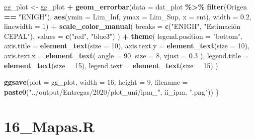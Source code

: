 \documentclass[
  12pt,
]{book}
\newenvironment{Shaded}{\begin{snugshade}}{\end{snugshade}}
\newcommand{\AttributeTok}[1]{\textcolor[rgb]{0.13,0.29,0.53}{#1}}
\newcommand{\DecValTok}[1]{\textcolor[rgb]{0.00,0.00,0.81}{#1}}
\newcommand{\FloatTok}[1]{\textcolor[rgb]{0.00,0.00,0.81}{#1}}
\newcommand{\FunctionTok}[1]{\textcolor[rgb]{0.13,0.29,0.53}{\textbf{#1}}}
\newcommand{\NormalTok}[1]{#1}
\newcommand{\OtherTok}[1]{\textcolor[rgb]{0.56,0.35,0.01}{#1}}
\newcommand{\SpecialCharTok}[1]{\textcolor[rgb]{0.81,0.36,0.00}{\textbf{#1}}}
\newcommand{\StringTok}[1]{\textcolor[rgb]{0.31,0.60,0.02}{#1}}
\begin{document}
\begin{Shaded}
\begin{Highlighting}[]
\NormalTok{    gg\_plot }\OtherTok{\textless{}{-}}\NormalTok{  gg\_plot }\SpecialCharTok{+}
      \FunctionTok{geom\_errorbar}\NormalTok{(}\AttributeTok{data =}\NormalTok{ dat\_plot }\SpecialCharTok{\%\textgreater{}\%} \FunctionTok{filter}\NormalTok{(Origen   }\SpecialCharTok{==} \StringTok{"ENIGH"}\NormalTok{),}
                    \FunctionTok{aes}\NormalTok{(}\AttributeTok{ymin =}\NormalTok{ Lim\_Inf, }\AttributeTok{ymax =}\NormalTok{ Lim\_Sup, }\AttributeTok{x =}\NormalTok{ ent),}
                    \AttributeTok{width =} \FloatTok{0.2}\NormalTok{, }\AttributeTok{linewidth =} \DecValTok{1}\NormalTok{) }\SpecialCharTok{+}
      \FunctionTok{scale\_color\_manual}\NormalTok{(}
         \AttributeTok{breaks =} \FunctionTok{c}\NormalTok{(}\StringTok{"ENIGH"}\NormalTok{, }\StringTok{"Estimación CEPAL"}\NormalTok{),}
         \AttributeTok{values =} \FunctionTok{c}\NormalTok{(}\StringTok{"red"}\NormalTok{, }\StringTok{"blue3"}\NormalTok{)}
\NormalTok{      ) }\SpecialCharTok{+}
      \FunctionTok{theme}\NormalTok{(}
        \AttributeTok{legend.position =} \StringTok{"bottom"}\NormalTok{,}
        \AttributeTok{axis.title =} \FunctionTok{element\_text}\NormalTok{(}\AttributeTok{size =} \DecValTok{10}\NormalTok{),}
        \AttributeTok{axis.text.y =} \FunctionTok{element\_text}\NormalTok{(}\AttributeTok{size =} \DecValTok{10}\NormalTok{),}
        \AttributeTok{axis.text.x =} \FunctionTok{element\_text}\NormalTok{(}
          \AttributeTok{angle =} \DecValTok{90}\NormalTok{,}
          \AttributeTok{size =} \DecValTok{8}\NormalTok{,}
          \AttributeTok{vjust =} \FloatTok{0.3}
\NormalTok{        ),}
        \AttributeTok{legend.title =} \FunctionTok{element\_text}\NormalTok{(}\AttributeTok{size =} \DecValTok{15}\NormalTok{),}
        \AttributeTok{legend.text =} \FunctionTok{element\_text}\NormalTok{(}\AttributeTok{size =} \DecValTok{15}\NormalTok{)}
\NormalTok{      )}
   
    \FunctionTok{ggsave}\NormalTok{(}\AttributeTok{plot =}\NormalTok{ gg\_plot, }\AttributeTok{width =} \DecValTok{16}\NormalTok{, }\AttributeTok{height =} \DecValTok{9}\NormalTok{,}
           \AttributeTok{filename =} \FunctionTok{paste0}\NormalTok{(}\StringTok{"../output/Entregas/2020/plot\_uni/ipm\_"}\NormalTok{, ii\_ipm, }\StringTok{".png"}\NormalTok{))}
\NormalTok{\}}
\end{Highlighting}
\end{Shaded}

\hypertarget{mapas.r}{%
\chapter*{16\_Mapas.R}\label{mapas.r}}
\end{document}
